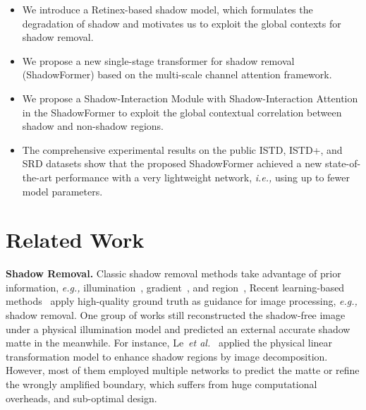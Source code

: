 \documentclass[letterpaper]{article} \usepackage{aaai23}  \usepackage{times}  \usepackage{helvet}  \usepackage{courier}  \usepackage[hyphens]{url}  \usepackage{graphicx} \urlstyle{rm} \def\UrlFont{\rm}  \usepackage{natbib}  \usepackage{caption} \frenchspacing  \setlength{\pdfpagewidth}{8.5in} \setlength{\pdfpageheight}{11in} \usepackage{algorithm}
\def\etal{\emph{et al.}}
\newcommand{\ie}{\textit{i.e., }}
\newcommand{\eg}{\textit{e.g., }}
\begin{document}
\begin{itemize}




    \item We introduce a Retinex-based shadow model, which formulates the degradation of shadow and motivates us to exploit the global contexts for shadow removal.
 


    \item We propose a new single-stage transformer for shadow removal (ShadowFormer) based on the multi-scale channel attention framework.
     
     \item We propose a Shadow-Interaction Module with Shadow-Interaction Attention in the ShadowFormer to exploit the global contextual correlation between shadow and non-shadow regions.


    \item The comprehensive experimental results on the public ISTD, ISTD+, and SRD datasets show that the proposed ShadowFormer achieved a new state-of-the-art performance with a very lightweight network, \ie using up to  fewer model parameters.  

\end{itemize}


\section{Related Work}

\noindent
\textbf{Shadow Removal.}
Classic shadow removal methods take advantage of prior information, \eg illumination~\cite{zhang2015shadow}, gradient~\cite{gryka2015learning}, and region~\cite{guo2012paired,guo2022exploiting,guo2021self},
Recent learning-based methods~\cite{zhang2021rellie,guo2021fino,guo2021multi,guo2022enhancing} apply high-quality ground truth as guidance for image processing, \eg shadow removal. 
One group of works still reconstructed the shadow-free image under a physical illumination model and predicted an external accurate shadow matte in the meanwhile.
For instance, 
Le~\etal~\cite{le2019shadow} applied the physical linear transformation model to enhance shadow regions by image decomposition.
However, most of them employed multiple networks to predict the matte or refine the wrongly amplified boundary, which suffers from huge computational overheads, and sub-optimal design.
\end{document}

